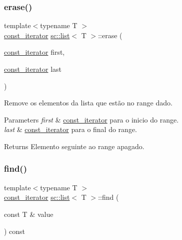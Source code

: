 \subsubsection{\texorpdfstring{erase()}{erase()}\hspace{0.1cm}{\footnotesize\ttfamily [4/4]}}
{\footnotesize\ttfamily template$<$typename T $>$ \\
\hyperlink{classsc_1_1list_1_1const__iterator}{const\+\_\+iterator} \hyperlink{classsc_1_1list}{sc\+::list}$<$ T $>$\+::erase (\begin{DoxyParamCaption}\item[{\hyperlink{classsc_1_1list_1_1const__iterator}{const\+\_\+iterator}}]{first,  }\item[{\hyperlink{classsc_1_1list_1_1const__iterator}{const\+\_\+iterator}}]{last }\end{DoxyParamCaption})\hspace{0.3cm}{\ttfamily [inline]}}

Remove os elementos da lista que estão no range dado. 
\begin{DoxyParams}{Parameters}
{\em first} & \hyperlink{classsc_1_1list_1_1const__iterator}{const\+\_\+iterator} para o inicio do range. \\
\hline
{\em last} & \hyperlink{classsc_1_1list_1_1const__iterator}{const\+\_\+iterator} para o final do range. \\
\hline
\end{DoxyParams}
\begin{DoxyReturn}{Returns}
Elemento seguinte ao range apagado. 
\end{DoxyReturn}
\mbox{\label{classsc_1_1list_a8709bb66990997b0602888b8d0c99860}} 
\subsubsection{\texorpdfstring{find()}{find()}}
{\footnotesize\ttfamily template$<$typename T $>$ \\
\hyperlink{classsc_1_1list_1_1const__iterator}{const\+\_\+iterator} \hyperlink{classsc_1_1list}{sc\+::list}$<$ T $>$\+::find (\begin{DoxyParamCaption}\item[{const T \&}]{value }\end{DoxyParamCaption}) const\hspace{0.3cm}{\ttfamily [inline]}}

